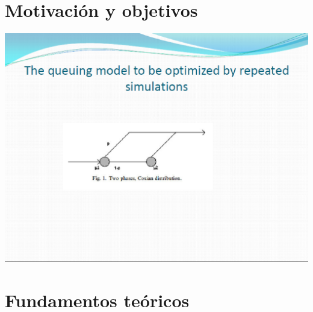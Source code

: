 \documentclass[spanish,a4paper,11pt,twoside]{report}
\begin{document}




\renewcommand{\thepage}{\arabic{page}}
\setcounter{page}{1}

\setlength{\parindent}{5mm}

\chapter{Motivación y objetivos}
\label{chapter:obj}


\begin{center}
\includegraphics[width=1\textwidth]{images/pic4.eps}\\[0.25cm]
\end{center}

\chapter{Fundamentos teóricos}
\label{chapter:teo}
\end{document}
